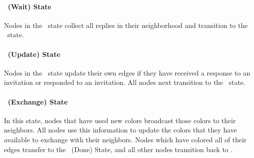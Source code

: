 \paragraph{\cWd\ (Wait) State}
Nodes in the \cWd\ state collect all replies in their neighborhood and transition to the \cUd\ state.

\paragraph{\cUd\ (Update) State}
Nodes in the \cUd\ state update their own edges if they have received a response to an invitation or responded to an invitation. All nodes next transition to the \cEd\ state. 

\paragraph{\cEd\ (Exchange) State}
In this state, nodes that have used new colors broadcast those colors to their neighbors. All nodes use this information to update the colors that they have available to exchange with their neighbors. Nodes which have colored all of their edges transfer to the \cDd\ (Done) State, and all other nodes transition back to \cCd.

